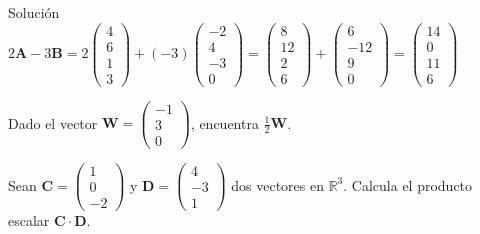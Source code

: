 \begin{solution}
     Solución $2 \mathbf{A}-3 \mathbf{B}=2\left(\begin{array}{l}4 \\ 6 \\ 1 \\ 3\end{array}\right)+(-3)\left(\begin{array}{r}-2 \\ 4 \\ -3 \\ 0\end{array}\right)=\left(\begin{array}{r}8 \\ 12 \\ 2 \\ 6\end{array}\right)+\left(\begin{array}{r}6 \\ -12 \\ 9 \\ 0\end{array}\right)=\left(\begin{array}{r}14 \\ 0 \\ 11 \\ 6\end{array}\right)$
\end{solution}

\begin{exercise}
Dado el vector \( \mathbf{W} = \begin{pmatrix} -1 \\ 3 \\ 0 \end{pmatrix} \), encuentra \( \frac{1}{2} \mathbf{W} \).
\end{exercise}

\begin{exercise}
Sean \( \mathbf{C} = \begin{pmatrix} 1 \\ 0 \\ -2 \end{pmatrix} \) y \( \mathbf{D} = \begin{pmatrix} 4 \\ -3 \\ 1 \end{pmatrix} \) dos vectores en \( \mathbb{R}^3 \). Calcula el producto escalar \( \mathbf{C} \cdot \mathbf{D} \).
\end{exercise}
